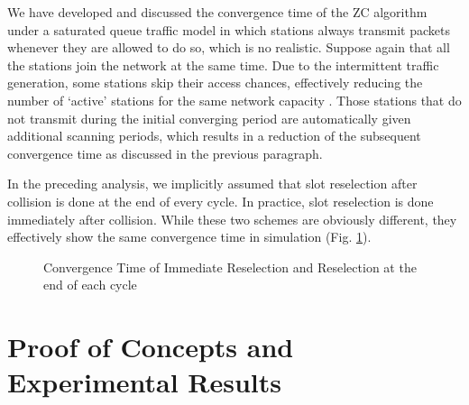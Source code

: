 \documentclass{acm_proc_article-sp}
\begin{document}
We have developed and discussed the convergence time of the ZC algorithm under a saturated queue traffic model in which stations always transmit packets whenever they are allowed to do so, which is no realistic.  Suppose again that all the stations join the network at the same time. Due to the intermittent traffic generation, some stations skip their access chances, effectively reducing the number of `active' stations for the same network capacity . Those stations that do not transmit during the initial converging period are automatically given additional scanning periods, which results in a reduction of the subsequent convergence time as discussed in the previous paragraph. 

In the preceding analysis, we implicitly assumed that slot reselection after collision is done at the end of every cycle. In practice, slot reselection is done immediately after collision. While these two schemes are obviously different, they effectively show the same convergence time in simulation (Fig. \ref{fig.reselection}).
\begin{figure}
   \begin{center}
   \end{center}
   \begin{center}
   \caption{Convergence Time of Immediate Reselection and Reselection at the end of each cycle}
   \label{fig.reselection}
   \end{center}
\vspace{-0.2in}
\end{figure}



\section{Proof of Concepts and Experimental Results}
\label{s.experiment}
\end{document}
